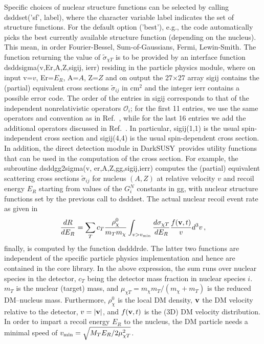 \documentclass[a4paper,10pt,oneside]{book}
\newcommand{\code}[1]{\ft{#1}}
\newcommand{\ds}{{\sffamily DarkSUSY}}
\newcommand{\ft}[1]{\textsf{#1}}
\begin{document}
Specific choices of nuclear structure functions can be selected by calling \code{dsddset('sf',} \code{label)}, where the 
character variable \code{label} indicates the set of structure functions. For the default option ('\code{best}'),
e.g., the code automatically picks the best currently available structure function (depending on the nucleus). 
This mean, in order Fourier-Bessel, Sum-of-Gaussians, Fermi, Lewin-Smith.
The function returning the value of $\tilde\sigma_{\chi T}$ is to be provided by an interface function 
\code{dsddsigma(v,Er,A,Z,sigij, ierr)} residing in the particle physics module, where on input \code{v=$v$}, 
\code{Er=$E_R$}, 
\code{A=$A$}, \code{Z=$Z$} and on output the 27$\times$27 array \code{sigij} contains the (partial) equivalent 
cross sections  $\tilde\sigma_{ij}$ in cm$^2$ and the integer \code{ierr} contains a possible error code. 
The order of the entries in \code{sigij} corresponds to that of the independent nonrelativistic operators 
$\mathcal{O}_i$; for the first 11 entries, we use the same operators and convention as in 
Ref.~\cite{Fitzpatrick:2012ix}, while for the last 16 entries  we add the additional operators discussed in 
Ref.~\cite{GondoloScopel}. In particular, \code{sigij(1,1)} is the 
usual spin-independent cross section and \code{sigij(4,4)} is the usual spin-dependent cross section.
In addition, the direct detection module in \ds\ provides utility functions that can be used in the computation of the 
cross section. For example, the subroutine \code{dsddgg2sigma(v,} \code{er,A,Z,gg,sigij,ierr)} computes the (partial) 
equivalent  scattering cross sections $\tilde\sigma_{ij}$ for nucleus $(A,Z)$ at relative velocity $v$ and recoil energy 
$E_R$ starting from values of the $G_i^N$ constants in \code{gg}, with nuclear structure functions set by the 
previous call to \code{dsddset}. The actual nuclear recoil event rate as given in 
\begin{equation}
\frac{dR}{dE_R} = \sum_T c_T \frac{\rho_\chi^0}{m_T  m_\chi} \int_{v>v_{\rm min}} \frac{d\sigma_{\chi T}}{dE_R}  \frac{f({\bf v},t)}{v} d^3 v\,,
\label{eq:dRdE} 
\end{equation}
finally, is computed by the function \code{dsdddrde}.
The latter two functions are independent of the specific particle physics implementation and hence 
are contained in the core library.
In the above expression, the sum  runs over nuclear species in the detector, $c_T$ being the detector mass fraction in nuclear species 
$i$. $m_T$ is the nuclear (target) mass, and $\mu_{\chi T} = m_\chi m_T /(m_\chi + m_T)$ is the reduced DM--nucleus 
mass. 
Furthermore, $\rho_\chi^0$ is the local DM density, ${\bf v}$ the DM velocity relative to the detector, $v=|{\bf v}|$, and 
$f({\bf v},t)$ is the (3D) DM velocity distribution.  In order to impart a recoil energy $E_R$ to the nucleus, the DM
particle needs a minimal speed of $v_{\rm min}=\sqrt{M_TE_R/2\mu^2_{\chi T}}$. 
\end{document}
